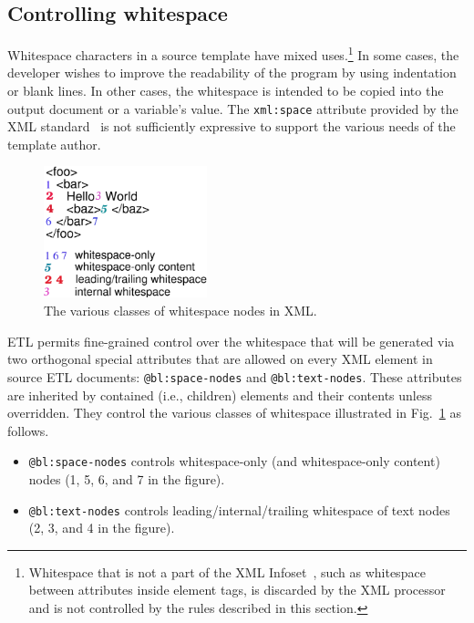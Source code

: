 \documentclass{www2003-submission}
\newcommand{\smtexttt}[1]{{\small\texttt{#1}}}
\newcommand{\figref}[1]{Fig.~\ref{fig-#1}}
\begin{document}
\subsection{Controlling whitespace}

Whitespace characters in a source template have mixed
uses.\footnote{Whitespace that is not a part of the XML
Infoset~\cite{XML-infoset}, such as whitespace between attributes
inside element tags, is discarded by the XML processor and is not
controlled by the rules described in this section.}  In some cases,
the developer wishes to improve the readability of the program by
using indentation or blank lines.  In other cases, the whitespace is
intended to be copied into the output document or a variable's value.
The \smtexttt{xml:space} attribute provided by the XML
standard~\cite[2.10]{XML} is not sufficiently expressive to support
the various needs of the template author.

\begin{figure}[bt]
\begin{centering}
\includegraphics[height=1.5in]{etl-whitespace-rules.eps}
\caption{The various classes of whitespace nodes in XML. \label{fig-ws-rules}}
\end{centering}
\end{figure}

ETL permits fine-grained control over the whitespace that will be
generated via two orthogonal special attributes that are allowed on
every XML element in source ETL documents: \smtexttt{@bl:space-nodes}
and \smtexttt{@bl:text-nodes}.  These attributes are inherited by
contained (i.e., children) elements and their contents unless
overridden.  They control the various classes of whitespace
illustrated in \figref{ws-rules} as follows.

\begin{itemize}
\item \smtexttt{@bl:space-nodes} controls whitespace-only (and
      whitespace-only content) nodes (1, 5, 6, and 7 in the figure).
\item \smtexttt{@bl:text-nodes} controls leading/internal/trailing whitespace of
      text nodes (2, 3, and 4 in the figure).
\end{itemize}
\end{document}
